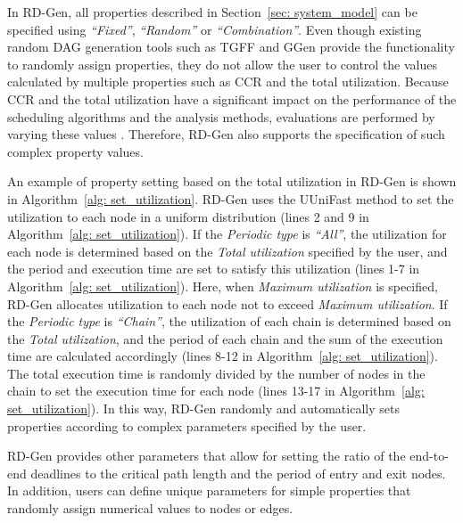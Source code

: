 In RD-Gen, all properties described in Section~\ref{sec: system_model} can be specified using {\it “Fixed”}, {\it “Random”} or {\it “Combination”}.
Even though existing random DAG generation tools such as TGFF and GGen provide the functionality to randomly assign properties, they do not allow the user to control the values calculated by multiple properties such as CCR and the total utilization.
Because CCR and the total utilization have a significant impact on the performance of the scheduling algorithms and the analysis methods, evaluations are performed by varying these values \cite{he2021response, agrawal2020hard, senapati2021hmds, sulaiman2021hybrid}.
Therefore, RD-Gen also supports the specification of such complex property values.

An example of property setting based on the total utilization in RD-Gen is shown in Algorithm~\ref{alg: set_utilization}.
RD-Gen uses the UUniFast method \cite{bini2005measuring} to set the utilization to each node in a uniform distribution (lines 2 and 9 in Algorithm~\ref{alg: set_utilization}).
If the {\it Periodic type} is {\it “All”}, the utilization for each node is determined based on the {\it Total utilization} specified by the user, and the period and execution time are set to satisfy this utilization (lines 1-7 in Algorithm~\ref{alg: set_utilization}).
Here, when {\it Maximum utilization} is specified, RD-Gen allocates utilization to each node not to exceed {\it Maximum utilization}.
If the {\it Periodic type} is {\it “Chain”}, the utilization of each chain is determined based on the {\it Total utilization}, and the period of each chain and the sum of the execution time are calculated accordingly (lines 8-12 in Algorithm~\ref{alg: set_utilization}).
The total execution time is randomly divided by the number of nodes in the chain to set the execution time for each node (lines 13-17 in Algorithm~\ref{alg: set_utilization}).
In this way, RD-Gen randomly and automatically sets properties according to complex parameters specified by the user.

RD-Gen provides other parameters that allow for setting the ratio of the end-to-end deadlines to the critical path length and the period of entry and exit nodes.
In addition, users can define unique parameters for simple properties that randomly assign numerical values to nodes or edges.
